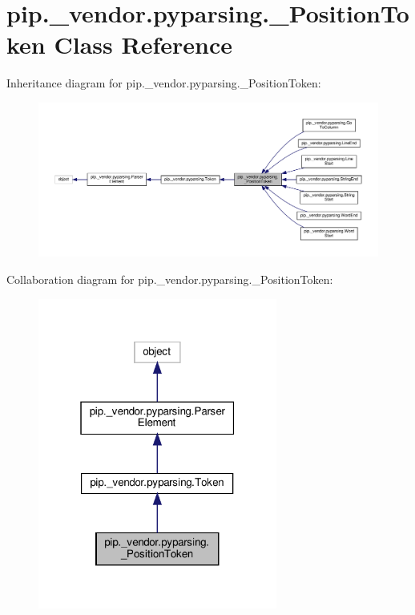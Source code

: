 \hypertarget{classpip_1_1__vendor_1_1pyparsing_1_1__PositionToken}{}\section{pip.\+\_\+vendor.\+pyparsing.\+\_\+\+Position\+Token Class Reference}
\label{classpip_1_1__vendor_1_1pyparsing_1_1__PositionToken}


Inheritance diagram for pip.\+\_\+vendor.\+pyparsing.\+\_\+\+Position\+Token\+:
\nopagebreak
\begin{figure}[H]
\begin{center}
\leavevmode
\includegraphics[width=350pt]{classpip_1_1__vendor_1_1pyparsing_1_1__PositionToken__inherit__graph}
\end{center}
\end{figure}


Collaboration diagram for pip.\+\_\+vendor.\+pyparsing.\+\_\+\+Position\+Token\+:
\nopagebreak
\begin{figure}[H]
\begin{center}
\leavevmode
\includegraphics[width=223pt]{classpip_1_1__vendor_1_1pyparsing_1_1__PositionToken__coll__graph}
\end{center}
\end{figure}
